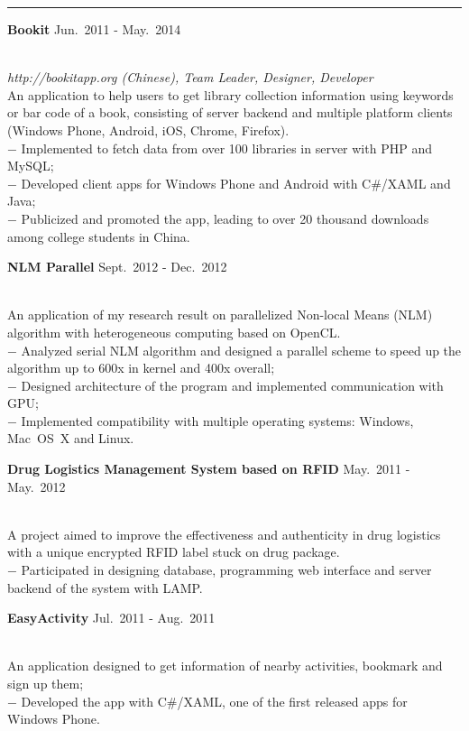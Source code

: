 \documentclass[a4paper,10pt]{article}
\newcommand{\shadedsection}[1]{
    \setlength{\fboxsep}{0pt}
    \colorbox{shadecolor}{%
        \begin{minipage}{\linewidth}%
            \vspace{0.2em}%
            #1%
        \end{minipage}%
    }
}
\newenvironment{rSection}[1]{ %
  \medskip
  \hspace{-1.5em}{\color{Blue}\MakeUppercase{\large \bf {#1}}} %
  \vspace{-0.2em}
  \medskip
  \hrule %
  \begin{list}{}{ %
    \setlength{\leftmargin}{1.5em} %
  }
\setlength{\itemsep}{1pt}
  \item[]
}{
  \end{list}
}
\newcommand{\detail}[1]{{$-$ {#1}}}
\newcommand{\period}[3]{\normalsize {#1} \hfill {#2} - {#3}}
\begin{document}
\begin{rSection}{Relevant Projects}
  \vspace{-1.5em}
    
  \item
    \shadedsection{\period{\bf Bookit}{Jun.~2011}{May.~2014}}\\
    {\em http://bookitapp.org (Chinese), Team Leader, Designer, Developer}\\
    An application to help users to get library collection information using keywords or bar code of a book, consisting of server backend and multiple platform clients (Windows Phone, Android, iOS, Chrome, Firefox).\\
    \detail{Implemented to fetch data from over 100 libraries in server with PHP and MySQL;}\\
    \detail{Developed client apps for Windows Phone and Android with C\#/XAML and Java;}\\
    \detail{Publicized and promoted the app, leading to over 20 thousand downloads among college students in China.}
    
  \item
    \shadedsection{\period{\bf NLM Parallel}{Sept.~2012}{Dec.~2012}}\\
    An application of my research result on parallelized Non-local Means (NLM) algorithm with heterogeneous computing based on OpenCL.\\
    \detail{Analyzed serial NLM algorithm and designed a parallel scheme to speed up the algorithm up to 600x in kernel and 400x overall;}\\
    \detail{Designed architecture of the program and implemented communication with GPU;}\\
    \detail{Implemented compatibility with multiple operating systems: Windows, Mac~OS~X and Linux.}
    
  \item
    \shadedsection{\period{\bf Drug Logistics Management System based on RFID}{May.~2011}{May.~2012}}\\
    A project aimed to improve the effectiveness and authenticity in drug logistics with a unique encrypted RFID label stuck on drug package.\\
    \detail{Participated in designing database, programming web interface and server backend of the system with LAMP.}

  \item
    \shadedsection{\period{\bf EasyActivity}{Jul.~2011}{Aug.~2011}}\\
    An application designed to get information of nearby activities, bookmark and sign up them;\\
    \detail{Developed the app with C\#/XAML, one of the first released apps for Windows Phone.}
\end{rSection}
\end{document}
